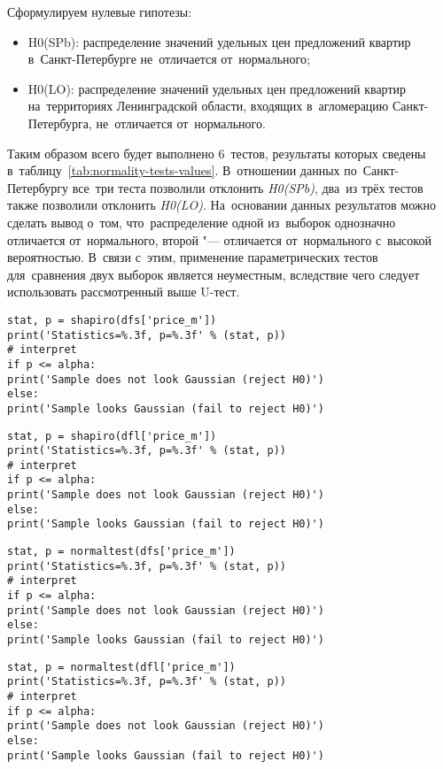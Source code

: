 \documentclass[]{scrartcl}
\begin{document}
Сформулируем нулевые гипотезы:
\begin{itemize}
	\item H0(SPb): распределение значений удельных цен предложений квартир в~Санкт-Петербурге не~отличается от~нормального;
	\item H0(LO): распределение значений удельных цен предложений квартир на~территориях Ленинградской области, входящих в~агломерацию Санкт-Петербурга, не~отличается от~нормального.
\end{itemize}
Таким образом всего будет выполнено 6~тестов, результаты которых сведены в~таблицу~\ref{tab:normality-tests-values}. В~отношении данных по~Санкт-Петербургу все~три теста позволили отклонить \emph{H0(SPb)}, два~из трёх тестов также позволили отклонить \emph{H0(LO)}. На~основании данных результатов можно сделать вывод о~том, что~распределение одной из~выборок однозначно отличается от~нормального, второй "--- отличается от~нормального с~высокой вероятностью. В~связи с~этим, применение параметрических тестов для~сравнения двух выборок является неуместным, вследствие чего следует использовать рассмотренный выше U-тест.
\begin{lstlisting}[float, caption = Тест Шапиро-Уилка для~данных по~Санкт-Петербургу, firstnumber=1, label= lst:shapiro-wilk-test-spb]
stat, p = shapiro(dfs['price_m'])
print('Statistics=%.3f, p=%.3f' % (stat, p))
# interpret
if p <= alpha:
print('Sample does not look Gaussian (reject H0)')
else:
print('Sample looks Gaussian (fail to reject H0)')
\end{lstlisting}
%
\begin{lstlisting}[float, caption = Тест Шапиро-Уилка для~данных по~Ленинградской области, firstnumber=1, label= lst:shapiro-wilk-test-lo]
stat, p = shapiro(dfl['price_m'])
print('Statistics=%.3f, p=%.3f' % (stat, p))
# interpret
if p <= alpha:
print('Sample does not look Gaussian (reject H0)')
else:
print('Sample looks Gaussian (fail to reject H0)')
\end{lstlisting}  
%
\begin{lstlisting}[float, caption = Тест K2 Агостино для~данных по~Санкт-Петербургу, firstnumber=1, label= lst:K^2-D'Agostino-test-spb]
stat, p = normaltest(dfs['price_m'])
print('Statistics=%.3f, p=%.3f' % (stat, p))
# interpret
if p <= alpha:
print('Sample does not look Gaussian (reject H0)')
else:
print('Sample looks Gaussian (fail to reject H0)')
\end{lstlisting}
%
\begin{lstlisting}[float, caption = Тест K2 Агостино для~данных по~Ленинградской области, firstnumber=1, label= lst:K^2-D'Agostino-test-lo]
stat, p = normaltest(dfl['price_m'])
print('Statistics=%.3f, p=%.3f' % (stat, p))
# interpret
if p <= alpha:
print('Sample does not look Gaussian (reject H0)')
else:
print('Sample looks Gaussian (fail to reject H0)')
\end{lstlisting}  
\end{document}

